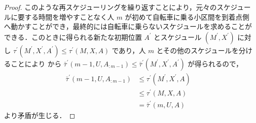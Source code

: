 \begin{proof}
  このような再スケジューリングを繰り返すことにより，元々のスケジュールに要する時間を増やすことなく人 $m$ が初めて自転車に乗る小区間を到着点側へ動かすことができ，最終的には自転車に乗らないスケジュールを求めることができる．このときに得られる新たな初期位置 $A^\prime$ とスケジュール $(M^\prime, X^\prime)$ に対し $\tau^\prime(M^\prime, X^\prime, A^\prime) \leq \tau^\prime(M, X, A)$ であり，人 $m$ とその他のスケジュールを分けることにより  から $\bar\tau^\prime(m - 1, U, A_{:m-1}) \leq \bar\tau^\prime(M^\prime, X^\prime, A^\prime)$ が得られるので，
  \begin{align}
    \bar\tau^\prime(m - 1, U, A_{:m-1}) &\leq \tau^\prime(M^\prime, X^\prime, A) \\
                                        &\leq \tau^\prime(M, X, A) \\
                                        &= \bar\tau^\prime(m, U, A)
  \end{align}
  より矛盾が生じる．





\end{proof}
